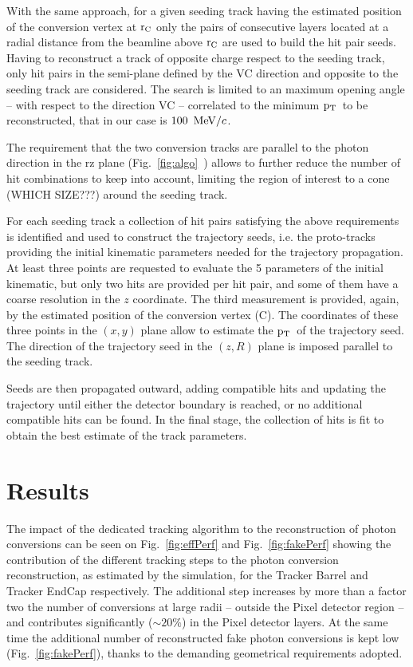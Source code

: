 \documentclass[a4paper]{jpconf}
\def \pt{$\p_{\rm T}$~}
\begin{document}
With the same approach, for a given seeding track  having  the estimated position of the conversion vertex at  $\rm r_C$ only the pairs of consecutive layers located at a radial distance from the beamline above $\rm r_C$ are used to build the hit pair seeds. 
%
Having to reconstruct a track of opposite charge respect to the seeding track, only hit pairs in the semi-plane defined by the VC direction and opposite to the seeding track are considered. The search is limited to an maximum opening angle -- with respect to the direction VC -- correlated to the minimum \pt to be reconstructed, that in our case is $100~{\rm \, MeV}/c$.

The requirement that the two conversion tracks are parallel to the photon direction in the rz plane (Fig.~\ref{fig:algo}~) allows to further   reduce the number of hit combinations to keep into account, limiting the region of interest to a cone (WHICH SIZE???) around the seeding track.


For each seeding track a collection of hit pairs satisfying the above requirements  is identified and used to construct the trajectory seeds, i.e. the proto-tracks providing the initial kinematic parameters needed for the trajectory propagation.
At least three points are requested to evaluate the 5 parameters of the initial kinematic, but only two hits are provided per hit pair, and some of them have a coarse resolution in the $z$ coordinate. The third measurement is provided, again, by the   estimated position of the conversion vertex (C). The coordinates of these three points in the $(x,y)$ plane allow to estimate the \pt of the trajectory seed. The direction of the trajectory seed in the $(z,R)$ plane is imposed parallel to the seeding track.

Seeds are then
propagated outward, adding compatible hits and updating the trajectory
until either the detector boundary is reached, or no additional
compatible hits can be found.  In the final stage, the collection of
hits is fit to obtain the best estimate of the track parameters.

\section{Results}

The impact of the dedicated tracking algorithm  to the reconstruction of photon conversions
 can be seen on Fig.~\ref{fig:effPerf} and Fig.~\ref{fig:fakePerf} 
showing the contribution of the different tracking steps to the photon conversion
reconstruction, as estimated by the simulation, for the Tracker Barrel and Tracker EndCap respectively.
The additional step increases by more than a factor two the number of conversions at large radii -- outside the Pixel detector region -- and contributes significantly ($\sim 20\%$) in the Pixel detector layers.
 At the same time the additional number of reconstructed fake photon conversions is kept low (Fig.~\ref{fig:fakePerf}), thanks to the demanding geometrical requirements adopted.
 
\end{document}

